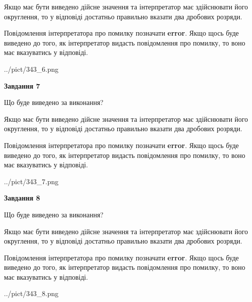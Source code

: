 \documentclass[12pt, ukrainian]{article}
\begin{document}
{\begin {Large}
Якщо має бути виведено дійсне значення та інтерпретатор має здійснювати його округлення, 
то у відповіді достатньо правильно вказати два дробових розряди.

Повідомлення інтерпретатора про помилку позначати \textbf{error}.
Якщо щось буде виведено до того, як інтерпретатор видасть повідомлення про помилку, 
то воно має вказуватись у відповіді. \par

\begin{center}
	{../pict/343_6.png}
\end{center}
\newpage

{\begin {center}\textbf{Завдання 7}\end {center}}\par
Що буде виведено за виконання? \par

Якщо має бути виведено дійсне значення та інтерпретатор має здійснювати його округлення, 
то у відповіді достатньо правильно вказати два дробових розряди.

Повідомлення інтерпретатора про помилку позначати \textbf{error}.
Якщо щось буде виведено до того, як інтерпретатор видасть повідомлення про помилку, 
то воно має вказуватись у відповіді. \par

\begin{center}
	{../pict/343_7.png}
\end{center}
\newpage

{\begin {center}\textbf{Завдання 8}\end {center}}\par
Що буде виведено за виконання? \par

Якщо має бути виведено дійсне значення та інтерпретатор має здійснювати його округлення, 
то у відповіді достатньо правильно вказати два дробових розряди.

Повідомлення інтерпретатора про помилку позначати \textbf{error}.
Якщо щось буде виведено до того, як інтерпретатор видасть повідомлення про помилку, 
то воно має вказуватись у відповіді. \par

\begin{center}
	{../pict/343_8.png}
\end{center}
\newpage


\end{Large}}
\end{document}
